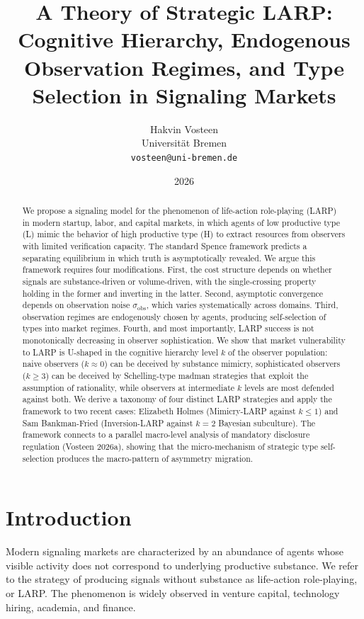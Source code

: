 \documentclass[11pt]{article}
\title{\Large\textbf{A Theory of Strategic LARP:}\\
Cognitive Hierarchy, Endogenous Observation Regimes, and Type Selection in Signaling Markets}
\author{Hakvin Vosteen\\\small Universit\"at Bremen\\\small \texttt{vosteen@uni-bremen.de}}
\date{2026}
\begin{document}
\maketitle

\begin{abstract}
\noindent We propose a signaling model for the phenomenon of life-action role-playing (LARP) in modern startup, labor, and capital markets, in which agents of low productive type (L) mimic the behavior of high productive type (H) to extract resources from observers with limited verification capacity. The standard Spence framework predicts a separating equilibrium in which truth is asymptotically revealed. We argue this framework requires four modifications. First, the cost structure depends on whether signals are substance-driven or volume-driven, with the single-crossing property holding in the former and inverting in the latter. Second, asymptotic convergence depends on observation noise $\sigma_{\mathrm{obs}}$, which varies systematically across domains. Third, observation regimes are endogenously chosen by agents, producing self-selection of types into market regimes. Fourth, and most importantly, LARP success is not monotonically decreasing in observer sophistication. We show that market vulnerability to LARP is U-shaped in the cognitive hierarchy level $k$ of the observer population: naive observers ($k \approx 0$) can be deceived by substance mimicry, sophisticated observers ($k \geq 3$) can be deceived by Schelling-type madman strategies that exploit the assumption of rationality, while observers at intermediate $k$ levels are most defended against both. We derive a taxonomy of four distinct LARP strategies and apply the framework to two recent cases: Elizabeth Holmes (Mimicry-LARP against $k \leq 1$) and Sam Bankman-Fried (Inversion-LARP against $k = 2$ Bayesian subculture). The framework connects to a parallel macro-level analysis of mandatory disclosure regulation (Vosteen 2026a), showing that the micro-mechanism of strategic type self-selection produces the macro-pattern of asymmetry migration.
\end{abstract}

\section{Introduction}

Modern signaling markets are characterized by an abundance of agents whose visible activity does not correspond to underlying productive substance. We refer to the strategy of producing signals without substance as life-action role-playing, or LARP. The phenomenon is widely observed in venture capital, technology hiring, academia, and finance.
\end{document}
